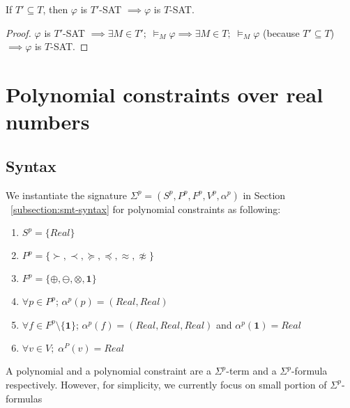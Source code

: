 \begin{lemma} \label{lemma:subtheory-SAT}
If $T' \subseteq T$, then $\varphi$ is $T'$-SAT $\implies \varphi$ is $T$-SAT.
\end{lemma}

\begin{proof}
$\varphi$ is $T'$-SAT $\implies \exists M \in T'; \; \models_M \varphi \implies \exists M \in T; \; \models_M \varphi$ (because $T' \subseteq T$) $\implies \varphi$ is $T$-SAT.
\end{proof}

\section{Polynomial constraints over real numbers}
\subsection{Syntax}
We instantiate the signature $\Sigma^p = (S^p, P^p, F^p, V^p, \alpha^p)$ in Section ~\ref{subsection:smt-syntax} for polynomial constraints as following:
\begin{enumerate}
\item $S^p = \{Real\}$
\item $P^p = \{\succ, \prec, \succeq, \preceq, \approx, \not\approx\}$
\item $F^p = \{\oplus, \ominus, \otimes, \mathbf{1}\}$
\item $\forall p \in P^p$; $\alpha^p(p) = (Real, Real)$
\item $\forall f \in F^p\setminus \{\mathbf{1}\}$; $\alpha^p(f) = (Real, Real, Real)$ and $\alpha^p(\mathbf{1})=Real$
\item $\forall v \in V; \; \alpha^P(v) = Real$
\end{enumerate}
A polynomial and a polynomial constraint are a $\Sigma^p$-term and a $\Sigma^p$-formula respectively. However, for simplicity, we currently focus on small portion of $\Sigma^p$-formulas

